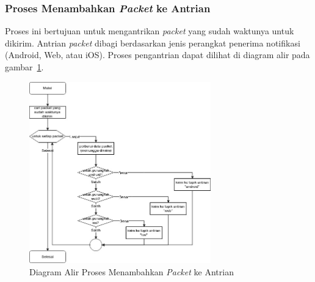 \subsubsection{Proses Menambahkan \textit{Packet} ke Antrian}
\par Proses ini bertujuan untuk mengantrikan \textit{packet} yang sudah waktunya untuk dikirim.
Antrian
\textit{packet} dibagi berdasarkan jenis perangkat penerima notifikasi (Android, Web, atau iOS).
Proses pengantrian
dapat dilihat di diagram alir pada gambar~\ref{flowchart_menambahkan_packet_ke_antrian}.
\begin{figure}[H]
    \centering\includegraphics[width=0.7\textwidth]{bab3/figures/flowchart_menambahkan_packet_ke_antrian.jpg}
    \caption{Diagram Alir Proses Menambahkan \textit{Packet} ke Antrian}
    \label{flowchart_menambahkan_packet_ke_antrian}
\end{figure}

